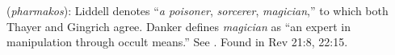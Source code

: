 \item[Magician,]

(\textit{pharmakos}):
Liddell denotes ``\emph{a poisoner}, \emph{sorcerer}, \emph{magician},'' to which both Thayer and Gingrich agree. Danker defines \emph{magician} as ``an expert in manipulation through occult means.'' See .
Found in Rev 21:8, 22:15.
